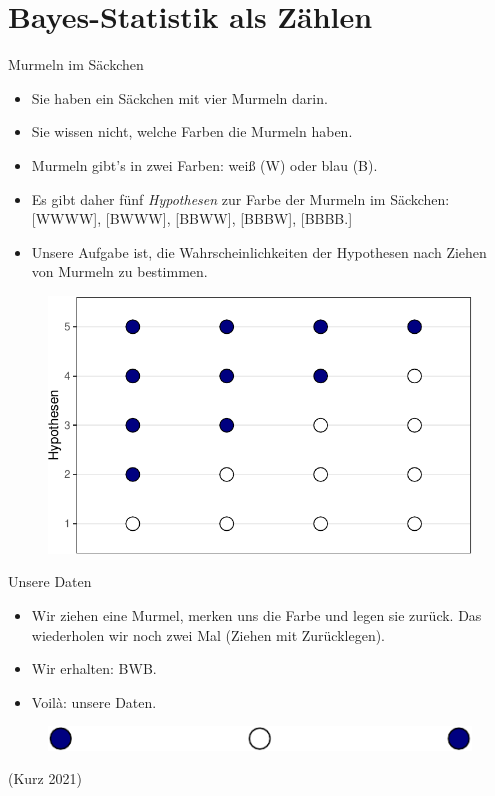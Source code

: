 \documentclass[
  ngerman,
  ignorenonframetext,
]{beamer}
\begin{document}
\hypertarget{bayes-statistik-als-zuxe4hlen}{%
\section{Bayes-Statistik als
Zählen}\label{bayes-statistik-als-zuxe4hlen}}

\begin{frame}{Murmeln im Säckchen}
\protect\hypertarget{murmeln-im-suxe4ckchen}{}
\begin{itemize}
\item
  Sie haben ein Säckchen mit vier Murmeln darin.
\item
  Sie wissen nicht, welche Farben die Murmeln haben.
\item
  Murmeln gibt's in zwei Farben: weiß (W) oder blau (B).
\item
  Es gibt daher fünf \emph{Hypothesen} zur Farbe der Murmeln im
  Säckchen: {[}WWWW{]}, {[}BWWW{]}, {[}BBWW{]}, {[}BBBW{]}, {[}BBBB.{]}
\item
  Unsere Aufgabe ist, die Wahrscheinlichkeiten der Hypothesen nach
  Ziehen von Murmeln zu bestimmen.
\end{itemize}

\begin{figure}[H]
\includegraphics[width=0.5\linewidth]{unnamed-chunk-5-1} \end{figure}
\end{frame}

\begin{frame}{Unsere Daten}
\protect\hypertarget{unsere-daten}{}
\begin{itemize}
\item
  Wir ziehen eine Murmel, merken uns die Farbe und legen sie zurück. Das
  wiederholen wir noch zwei Mal (Ziehen mit Zurücklegen).
\item
  Wir erhalten: BWB.
\item
  Voilà: unsere Daten.
\end{itemize}

\begin{figure}[H]
\includegraphics[width=0.7\linewidth]{unnamed-chunk-6-1} \end{figure}

(Kurz 2021)
\end{frame}
\end{document}
